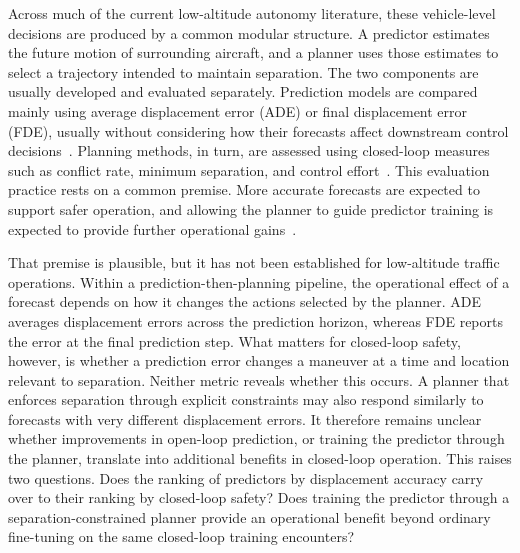 \documentclass[11pt]{article}
\theoremstyle{plain}
\theoremstyle{definition}
\begin{document}
Across much of the current low-altitude autonomy literature, these
vehicle-level decisions are produced by a common modular structure.
A predictor estimates the future motion of surrounding aircraft, and
a planner uses those estimates to select a trajectory intended to
maintain separation. The two components are usually developed and evaluated separately. Prediction models are compared mainly using average displacement error (ADE) or final displacement error (FDE), usually without considering how their forecasts affect downstream control decisions~\citep{zhang2023flight,guo2024integrating}. Planning methods, in turn, are assessed using closed-loop measures such as conflict rate, minimum separation, and control effort~\citep{lindemann2023safe}. This evaluation practice rests on a common premise. More accurate forecasts are expected to support safer operation, and allowing the planner to guide predictor training is expected to provide further operational gains~\citep{huang2023differentiable,zhang2025bridging,mandi2024decisionfocused}.

That premise is plausible, but it has not been established for low-altitude traffic operations. Within a prediction-then-planning pipeline, the operational effect of a forecast depends on how it changes the actions selected by the planner. ADE averages displacement errors across the prediction horizon, whereas FDE reports the error at the final prediction step. What matters for closed-loop safety, however, is whether a prediction error changes a maneuver at a time and location relevant to separation. Neither metric reveals whether this occurs. A planner that enforces separation through explicit constraints may also respond similarly to forecasts with very different displacement errors. It therefore remains unclear whether improvements in open-loop prediction, or training the predictor through the planner, translate into additional benefits in closed-loop operation. This raises two questions. Does the ranking of predictors by displacement accuracy carry over to their ranking by closed-loop safety? Does training the predictor through a separation-constrained planner provide an operational benefit beyond ordinary fine-tuning on the same closed-loop training encounters?
\end{document}
